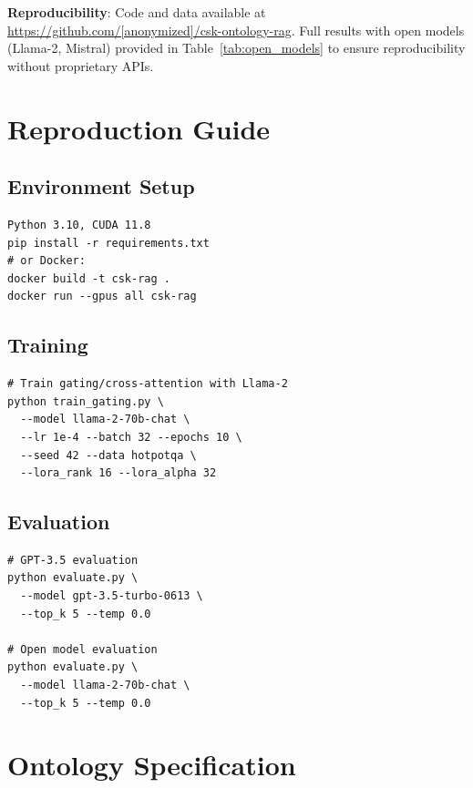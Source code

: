 \documentclass[10pt,twocolumn]{article}
\begin{document}
\textbf{Reproducibility}: Code and data available at \url{https://github.com/[anonymized]/csk-ontology-rag}. Full results with open models (Llama-2, Mistral) provided in Table~\ref{tab:open_models} to ensure reproducibility without proprietary APIs.




\appendix

\section{Reproduction Guide}
\label{app:repro}

\subsection{Environment Setup}
\begin{verbatim}
Python 3.10, CUDA 11.8
pip install -r requirements.txt
# or Docker:
docker build -t csk-rag .
docker run --gpus all csk-rag
\end{verbatim}

\subsection{Training}
\begin{verbatim}
# Train gating/cross-attention with Llama-2
python train_gating.py \
  --model llama-2-70b-chat \
  --lr 1e-4 --batch 32 --epochs 10 \
  --seed 42 --data hotpotqa \
  --lora_rank 16 --lora_alpha 32
\end{verbatim}

\subsection{Evaluation}
\begin{verbatim}
# GPT-3.5 evaluation
python evaluate.py \
  --model gpt-3.5-turbo-0613 \
  --top_k 5 --temp 0.0

# Open model evaluation
python evaluate.py \
  --model llama-2-70b-chat \
  --top_k 5 --temp 0.0
\end{verbatim}

\section{Ontology Specification}
\label{app:ontology}
\end{document}
